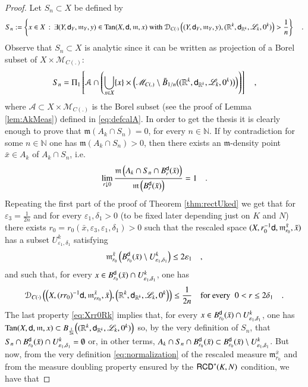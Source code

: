 \documentclass[11pt,reqno]{amsart}
\newcommand{\MM}{\mathscr{M}}
\newcommand{\mm}{\mathfrak m}
\newcommand{\sfd}{{\sf d}}
\newcommand{\LL}{\mathscr{L}}
\newcommand{\R}{\mathbb{R}}
\newcommand{\N}{\mathbb{N}}
\newcommand{\Tan}{{\rm Tan}}
\newcommand{\RCD}{{\sf RCD}}
\newcommand{\DC}{\mathcal D_{C(\cdot)}}
\newcommand{\vare}{\varepsilon}
\theoremstyle{definition}
\theoremstyle{remark}
\theoremstyle{remark}
\theoremstyle{remark}
\theoremstyle{remark}
\theoremstyle{remark}
\theoremstyle{remark}
\theoremstyle{remark}
\begin{document}
 \begin{proof}
 Let  $S_n\subset X$ be defined by
 $$S_n:=\left\{x \in X \, : \,  \exists (Y,\sfd_Y,\mm_Y,y)\in \Tan(X,\sfd,\mm,x) \text{ with } \DC\left((Y,\sfd_Y,\mm_Y,y),(\R^k,\sfd_{\R^k},\LL_k,0^k) \right)>\frac{1}{n}\right\} \quad. $$
 Observe that $S_n\subset X$ is analytic since it can be written as projection of a Borel subset of $X\times \MM_{C(.)}$:
 $$S_n=\Pi_1\left[ {\mathcal A} \cap \left( \bigcup_{x \in X} \{x\} \times \left( \MM_{C(.)} \setminus \bar{B}_{1/n}\big((\R^k,\sfd_{\R^k},\LL_k,0^k)\big) \right)  \right) \right]\quad,$$
 where ${\mathcal A}\subset X\times \MM_{C(.)}$ is the Borel subset (see the proof of Lemma \ref{lem:AkMeas}) defined in  \eqref{eq:defcalA}.
 In order to get the thesis it is clearly enough to prove that $\mm(A_k\cap S_n)=0$, for every $n \in \N$.  If by contradiction for some $n\in \N$ one has $\mm(A_k\cap S_n)>0$,  then there exists an $\mm$-density point $\bar{x}\in A_k$ of $A_k\cap S_n$, i.e.
 \begin{equation}\label{eq:mdensAkSn} 
 \lim_{r\downarrow 0} \frac{ \mm\left(A_k\cap S_n \cap B^{\sfd}_{r}(\bar{x})\right)}{\mm\left(B_r^{\sfd}(\bar{x})\right)}=1\quad .
 \end{equation}
 Repeating the first part of the proof of Theorem  \ref{thm:rectUked} we get that for  $\vare_3=\frac{1}{2n}$ and for every  $\vare_1,\delta_1>0$ (to be fixed later depending  just on $K$ and $N$) there exists $r_0=r_0(\bar{x},\vare_3,\vare_1,\delta_1)>0$ such that  the rescaled space $(X,r_0^{-1}\sfd, \mm^{\bar{x}}_{r_0}, \bar{x})$ has a  subset $U^k_{\vare_1,\delta_1}$ satisfying
 \begin{equation}\label{eq:Uke1d1e1}
 \mm^{\bar{x}}_{r_0} \left(B^{\sfd}_{r_0}(\bar{x})\setminus  U^k_{\vare_1,\delta_1}\right)\leq  2 \vare_1 \quad,
 \end{equation}
 and such that, for every $x \in B^{\sfd}_{r_0}(\bar{x})\cap  U^k_{\vare_1,\delta_1}$, one has
 \begin{equation}\label{eq:Xrr0Rk}
 \DC \left( \Big(X,(rr_0)^{-1}\sfd, \mm^{\bar{x}}_{rr_0}, \bar{x}\Big), \Big(\R^k,\sfd_{\R^k},\LL_k,0^k\Big)  \right)  \leq \frac{1}{2n} \quad \text{for every } \; 0<r\leq 2\delta_1\quad .
 \end{equation}
 The last property \eqref{eq:Xrr0Rk} implies that,   for every $x \in B^{\sfd}_{r_0}(\bar{x})\cap  U^k_{\vare_1,\delta_1}$, one has $\Tan(X, \sfd, \mm, x) \subset B_{\frac{1}{2n}} \Big((\R^k,\sfd_{\R^k},\LL_k,0^k)\Big)$ so, by the very definition of $S_n$, that $S_n\cap B^{\sfd}_{r_0}(\bar{x})\cap  U^k_{\vare_1,\delta_1}=\emptyset$ or, in other terms, $A_k\cap S_n \cap B^{\sfd}_{r_0}(\bar{x})\subset  B^{\sfd}_{r_0}(\bar{x})\setminus  U^k_{\vare_1,\delta_1}$. But now, from the very definition \eqref{eq:normalization}  of the rescaled measure $\mm^{\bar{x}}_{r_0}$ and from  the measure  doubling property ensured  by the $\RCD^*(K,N)$ condition, we have that

\end{proof}
\end{document}
